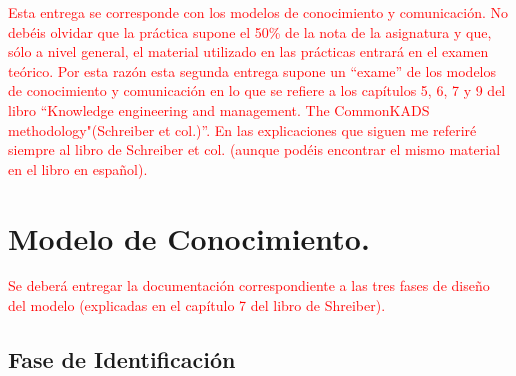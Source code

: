 \documentclass[12pt,a4paper,twoside,spanish]{article}      %
\begin{document}
 \pagestyle{myheadings} 

\setlength{\parindent}{1,5cm} \setlength{\parskip}{0,7cm}


\textcolor {red} {Esta entrega se corresponde con los modelos de conocimiento y comunicación.  No debéis olvidar que la práctica supone el 50\% de la nota de la asignatura y que, sólo a nivel general, el material utilizado en las prácticas entrará en el examen teórico. Por esta razón esta segunda entrega supone un ``exame'' de los modelos de conocimiento y comunicación en lo que se refiere a los capítulos 5, 6, 7 y 9 del libro ``Knowledge engineering and management. The CommonKADS methodology"(Schreiber et col.)''. En las explicaciones que siguen me referiré siempre al libro de Schreiber et col. (aunque podéis encontrar el mismo material en el libro en español).}


\section {Modelo de Conocimiento.}

\textcolor {red} {Se deberá entregar la documentación correspondiente a las tres fases de diseño del modelo (explicadas en el capítulo 7 del libro de Shreiber).}


\subsection{Fase de Identificación}
\end{document}
